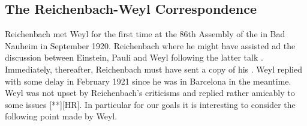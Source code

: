 \documentclass[draft]{article}
\begin{document}

%
%


\subsection{The Reichenbach-Weyl Correspondence}

Reichenbach met Weyl for the first time at the 86th Assembly of the  in Bad Nauheim in September 1920. Reichenbach where he might have assisted ad the discussion between Einstein, Pauli and Weyl following the latter talk \citep{Weyl1920}. Immediately, thereafter, Reichenbach must have sent a copy of his  \citep{Reichenbach1920a}. Weyl replied with some delay in February 1921 since he was in Barcelona in the meantime. Weyl was not upset by Reichenbach's criticisms and replied rather amicably to some issues  [**][HR]. In particular for our goals it is interesting to consider the following point made by Weyl.
\end{document}

